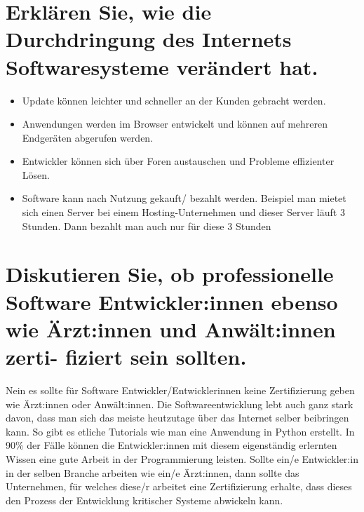 \documentclass[12pt]{article}
\begin{document}
\section{Erklären Sie, wie die Durchdringung des Internets Softwaresysteme verändert hat.}
\begin{itemize}
 \item Update können leichter und schneller an der Kunden gebracht werden.
 \item Anwendungen werden im Browser entwickelt und können auf mehreren Endgeräten abgerufen werden.
 \item Entwickler können sich über Foren austauschen und Probleme effizienter Lösen.
 \item Software kann nach Nutzung gekauft/ bezahlt werden. Beispiel man mietet sich einen Server bei einem Hosting-Unternehmen und dieser Server läuft 3 Stunden. Dann bezahlt man auch nur für diese 3 Stunden
\end{itemize}

\section{Diskutieren Sie, ob professionelle Software Entwickler:innen ebenso wie Ärzt:innen und Anwält:innen zerti-
fiziert sein sollten.}
Nein es sollte für Software Entwickler/Entwicklerinnen keine Zertifizierung geben wie Ärzt:innen oder Anwält:innen. Die  Softwareentwicklung lebt auch ganz stark davon, dass man sich das meiste heutzutage über das Internet selber beibringen kann. So gibt es etliche Tutorials wie man eine Anwendung in Python erstellt. In 90\% der Fälle können die Entwickler:innen mit diesem eigenständig erlernten Wissen eine gute Arbeit in der Programmierung leisten. Sollte ein/e Entwickler:in in der selben Branche arbeiten wie ein/e Ärzt:innen, dann sollte das Unternehmen, für welches diese/r arbeitet eine Zertifizierung erhalte, dass dieses den Prozess der Entwicklung kritischer Systeme abwickeln kann.
\end{document}
